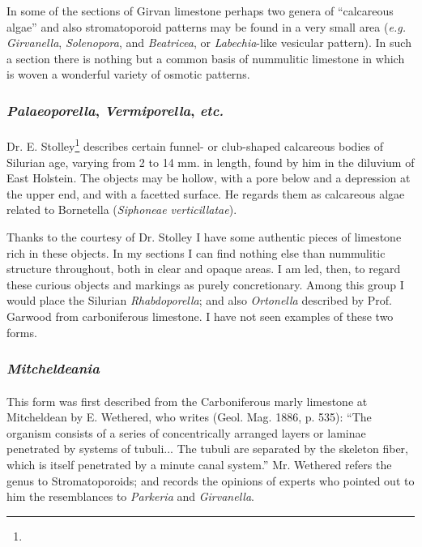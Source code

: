 \documentclass[a4paper, 12pt, oneside]{article}
\begin{document}
In some of the sections of Girvan limestone perhaps two genera of ``calcareous algae'' and also stromatoporoid patterns may be found in a very small area (\emph{e.g.} \emph{Girvanella}, \emph{Solenopora}, and \emph{Beatricea}, or \emph{Labechia}-like vesicular pattern). In such a section there is nothing but a common basis of nummulitic limestone in which is woven a wonderful variety of osmotic patterns.

\subsubsection{\emph{Palaeoporella}, \emph{Vermiporella}, \emph{etc.}}
\paragraph{}
Dr. E. Stolley\footnote{} describes certain funnel- or club-shaped calcareous bodies of Silurian age, varying from 2 to 14 mm. in length, found by him in the diluvium of East Holstein. The objects may be hollow, with a pore below and a depression at the upper end, and with a facetted surface. He regards them as calcareous algae related to Bornetella (\emph{Siphoneae verticillatae}).

Thanks to the courtesy of Dr. Stolley I have some authentic pieces of limestone rich in these objects. In my sections I can find nothing else than nummulitic structure throughout, both in clear and opaque areas. I am led, then, to regard these curious objects and markings as purely concretionary. Among this group I would place the Silurian \emph{Rhabdoporella}; and also \emph{Ortonella} described by Prof. Garwood from carboniferous limestone. I have not seen examples of these two forms.

\subsubsection{\emph{Mitcheldeania}}
\paragraph{}
This form was first described from the Carboniferous marly limestone at Mitcheldean by E. Wethered, who writes (Geol. Mag. 1886, p. 535): ``The organism consists of a series of concentrically arranged layers or laminae penetrated by systems of tubuli... The tubuli are separated by the skeleton fiber, which is itself penetrated by a minute canal system.'' Mr. Wethered refers the genus to Stromatoporoids; and records the opinions of experts who pointed out to him the resemblances to \emph{Parkeria} and \emph{Girvanella}.
\end{document}
